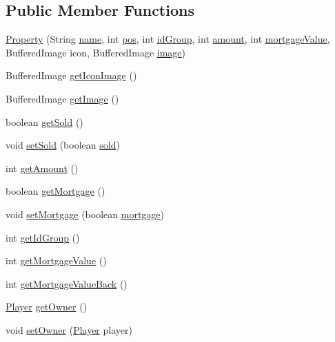 \subsection*{Public Member Functions}
\begin{DoxyCompactItemize}
\item 
\hyperlink{class_monopoly_1_1_logic_1_1_property_a866f0878a2593c56b73e9d0ee6ad37ee}{Property} (String \hyperlink{class_monopoly_1_1_logic_1_1_board_box_ad5cd8d9fc191dc2df82b9fe7766210fd}{name}, int \hyperlink{class_monopoly_1_1_logic_1_1_board_box_a750c8300a134809e0eb5772b3ba92258}{pos}, int \hyperlink{class_monopoly_1_1_logic_1_1_property_ab42a31cd99e909728aa49c0184f644b8}{id\+Group}, int \hyperlink{class_monopoly_1_1_logic_1_1_property_a3e5525c94c56e900372c5a13a8fe03fb}{amount}, int \hyperlink{class_monopoly_1_1_logic_1_1_property_ae4b874ede5de05f1f5b0ab329c2c58f5}{mortgage\+Value}, Buffered\+Image icon, Buffered\+Image \hyperlink{class_monopoly_1_1_logic_1_1_property_a1bd3d29f02147192157c57535fd0eca9}{image})
\item 
Buffered\+Image \hyperlink{class_monopoly_1_1_logic_1_1_property_af17e5d11794e3e4ba771937770e11719}{get\+Icon\+Image} ()
\item 
Buffered\+Image \hyperlink{class_monopoly_1_1_logic_1_1_property_a0919070bb7975e8551cad6f5743b5f37}{get\+Image} ()
\item 
boolean \hyperlink{class_monopoly_1_1_logic_1_1_property_a05b0db4aa4277052557b4fbb3ef6892d}{get\+Sold} ()
\item 
void \hyperlink{class_monopoly_1_1_logic_1_1_property_aee35f29d3931bd143002c5746ebef4a1}{set\+Sold} (boolean \hyperlink{class_monopoly_1_1_logic_1_1_property_a3a3b93ad91c78c5fc0ffd6f5bfbdad1b}{sold})
\item 
int \hyperlink{class_monopoly_1_1_logic_1_1_property_ad64f0164856581418e9a86bfc0cbc76a}{get\+Amount} ()
\item 
boolean \hyperlink{class_monopoly_1_1_logic_1_1_property_a3d90a3b32b39ff03e6902ee8b4e9eb9c}{get\+Mortgage} ()
\item 
void \hyperlink{class_monopoly_1_1_logic_1_1_property_af0cc92f2e23e67f1333035047e4abc89}{set\+Mortgage} (boolean \hyperlink{class_monopoly_1_1_logic_1_1_property_acedac56746517571ae6b1a1f2664bae8}{mortgage})
\item 
int \hyperlink{class_monopoly_1_1_logic_1_1_property_ab38c4860d9510be25024866bc68ee0f0}{get\+Id\+Group} ()
\item 
int \hyperlink{class_monopoly_1_1_logic_1_1_property_a6527ca71594ce7cbb1ca6771dc21abef}{get\+Mortgage\+Value} ()
\item 
int \hyperlink{class_monopoly_1_1_logic_1_1_property_a35a2b515849b4a5fc4d71611ae568e4a}{get\+Mortgage\+Value\+Back} ()
\item 
\hyperlink{class_monopoly_1_1_logic_1_1_player}{Player} \hyperlink{class_monopoly_1_1_logic_1_1_property_a7090f5002c44914c9627e981c9b89f29}{get\+Owner} ()
\item 
void \hyperlink{class_monopoly_1_1_logic_1_1_property_ac6e461d07647fd835bc3089e1ab6f614}{set\+Owner} (\hyperlink{class_monopoly_1_1_logic_1_1_player}{Player} player)
\end{DoxyCompactItemize}
